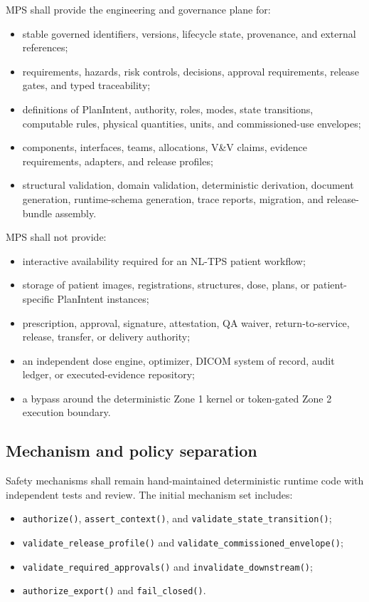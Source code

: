 \documentclass[11pt,letterpaper]{article}
\begin{document}
MPS shall provide the engineering and governance plane for:

\begin{itemize}
\item stable governed identifiers, versions, lifecycle state, provenance, and external references;
\item requirements, hazards, risk controls, decisions, approval requirements, release gates, and typed traceability;
\item definitions of PlanIntent, authority, roles, modes, state transitions, computable rules, physical quantities, units, and commissioned-use envelopes;
\item components, interfaces, teams, allocations, V\&V claims, evidence requirements, adapters, and release profiles;
\item structural validation, domain validation, deterministic derivation, document generation, runtime-schema generation, trace reports, migration, and release-bundle assembly.
\end{itemize}

MPS shall not provide:

\begin{itemize}
\item interactive availability required for an NL-TPS patient workflow;
\item storage of patient images, registrations, structures, dose, plans, or patient-specific PlanIntent instances;
\item prescription, approval, signature, attestation, QA waiver, return-to-service, release, transfer, or delivery authority;
\item an independent dose engine, optimizer, DICOM system of record, audit ledger, or executed-evidence repository;
\item a bypass around the deterministic Zone 1 kernel or token-gated Zone 2 execution boundary.
\end{itemize}

\subsection{Mechanism and policy separation}

Safety mechanisms shall remain hand-maintained deterministic runtime code with independent tests and review. The initial mechanism set includes:

\begin{itemize}
\item \texttt{authorize()}, \texttt{assert\_context()}, and \texttt{validate\_state\_transition()};
\item \texttt{validate\_release\_profile()} and \texttt{validate\_commissioned\_envelope()};
\item \texttt{validate\_required\_approvals()} and \texttt{invalidate\_downstream()};
\item \texttt{authorize\_export()} and \texttt{fail\_closed()}.
\end{itemize}
\end{document}
